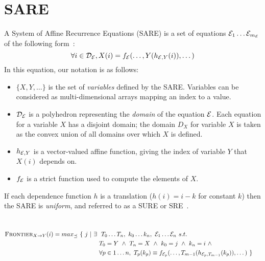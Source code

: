 \section{SARE}

A System of Affine Recurrence Equations (SARE) is a set of equations
${\cal E}_1 \dots {\cal E}_{m_{\cal E}}$ of the following form~\cite{DRV00}:
\begin{equation}
\forall i \in {\cal D_{\cal E}}, X(i) = f_{\cal E}(\dots, Y(h_{{\cal
E}, Y}(i)), \dots)
\label{eq:sare}
\end{equation}
In this equation, our notation is as follows:
\begin{itemize}

\item $\{X, Y, \dots\}$ is the set of {\it variables} defined by the
SARE.  Variables can be considered as multi-dimensional arrays mapping
an index to a value.

\item ${\cal D_{\cal E}}$ is a polyhedron representing the {\it
domain} of the equation ${\cal E}$.  Each equation for a variable $X$
has a disjoint domain; the domain $D_X$ for variable $X$ is taken as
the convex union of all domains over which $X$ is defined.

\item $h_{{\cal E}, Y}$ is a vector-valued affine function, giving the
index of variable $Y$ that $X(i)$ depends on.

\item $f_{\cal E}$ is a strict function used to compute the elements
of $X$.

\end{itemize}

If each dependence function $h$ is a translation ($h(i) = i - k$ for
constant $k$) then the SARE is {\it uniform}, and referred to as a
SURE or SRE~\cite{karp67}.


\section{\dep}

\begin{align*}
\textsc{Frontier}_{X \small{\rightarrow} Y}(i) = max_{\preceq}~\{~ j ~|~ \exists ~&~ T_0 \dots T_n, ~ k_0 \dots k_n, ~ {\cal E}_1 \dots {\cal E}_n ~ s.t. ~ & ~ \\ 
~ & T_0 = Y ~\wedge~ T_n = X ~\wedge~ k_0 = j ~\wedge~ k_n = i ~\wedge~ & ~ \\
~ & \forall p \in 1 \dots n, ~ T_p(k_p) \equiv f_{{\cal E}_p}(\dots, T_{m-1}(h_{{{\cal E}_p}, T_{m-1}}(k_p)), \dots) ~ \} & ~ \\
\end{align*}

